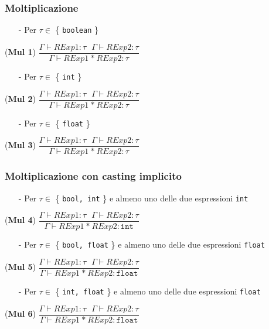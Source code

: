 \documentclass[12pt]{article}
\begin{document}
\subsubsection*{Moltiplicazione}
\begin{center}

\begin{itemize}
\item[-] Per $\tau \in$ \{ \texttt{boolean} \}
\end{itemize}
\noindent(\textbf{Mul 1})
$\dfrac{\Gamma \vdash RExp1:\tau\ \ \ \Gamma \vdash RExp2:\tau}{\Gamma \vdash RExp1\ \texttt{*}\ RExp2:\tau}$\\[0.1in]

\begin{itemize}
\item[-] Per $\tau \in$ \{ \texttt{int} \}
\end{itemize}
\noindent(\textbf{Mul 2})
$\dfrac{\Gamma \vdash RExp1:\tau\ \ \ \Gamma \vdash RExp2:\tau}{\Gamma \vdash RExp1\ \texttt{*}\ RExp2:\tau}$\\[0.1in]

\begin{itemize}
\item[-] Per $\tau \in$ \{ \texttt{float} \}
\end{itemize}
\noindent(\textbf{Mul 3})
$\dfrac{\Gamma \vdash RExp1:\tau\ \ \ \Gamma \vdash RExp2:\tau}{\Gamma \vdash RExp1\ \texttt{*}\ RExp2:\tau}$\\[0.1in]
\end{center}

\subsubsection*{Moltiplicazione con casting implicito}

\begin{center}
\begin{itemize}
\item[-] Per $\tau \in$ \{ \texttt{bool, int} \} e almeno uno delle due espressioni \texttt{int}
\end{itemize}
\noindent(\textbf{Mul 4})
$\dfrac{\Gamma \vdash RExp1:\tau\ \ \ \Gamma \vdash RExp2:\tau}{\Gamma \vdash RExp1\ \texttt{*}\ RExp2:\texttt{int}}$\\[0.1in]
\begin{itemize}
\item[-] Per $\tau \in$ \{ \texttt{bool, float} \} e almeno uno delle due espressioni \texttt{float}
\end{itemize}

\noindent(\textbf{Mul 5})
$\dfrac{\Gamma \vdash RExp1:\tau\ \ \ \Gamma \vdash RExp2:\tau}{\Gamma \vdash RExp1\ \texttt{*}\ RExp2:\texttt{float}}$\\[0.1in]
\begin{itemize}
\item[-] Per $\tau \in$ \{ \texttt{int, float} \} e almeno uno delle due espressioni \texttt{float}
\end{itemize}
\noindent(\textbf{Mul 6})
$\dfrac{\Gamma \vdash RExp1:\tau\ \ \ \Gamma \vdash RExp2:\tau}{\Gamma \vdash RExp1\ \texttt{*}\ RExp2:\texttt{float}}$\\[0.1in]
\end{center}
\end{document}
